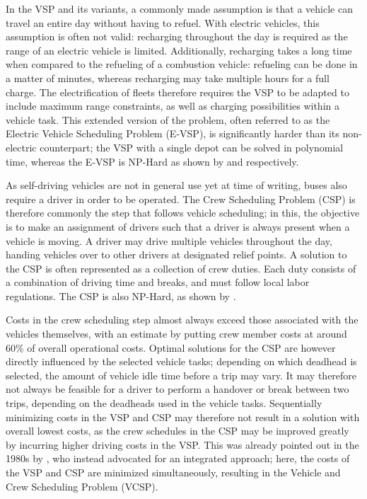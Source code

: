 \documentclass[]{article}
\begin{document}
In the VSP and its variants, a commonly made assumption is that a vehicle can travel an entire day without having to refuel. With electric vehicles, this assumption is often not valid: recharging throughout the day is required as the range of an electric vehicle is limited. Additionally, recharging takes a long time when compared to the refueling of a combustion vehicle: refueling can be done in a matter of minutes, whereas recharging may take multiple hours for a full charge. The electrification of fleets therefore requires the VSP to be adapted to include maximum range constraints, as well as charging possibilities within a vehicle task. This extended version of the problem, often referred to as the Electric Vehicle Scheduling Problem (E-VSP), is significantly harder than its non-electric counterpart; the VSP with a single depot can be solved in polynomial time, whereas the E-VSP is NP-Hard as shown by \citet{Bunte2009} and \citet{Sassi2014} respectively.

As self-driving vehicles are not in general use yet at time of writing, buses also require a driver in order to be operated. The Crew Scheduling Problem (CSP) is therefore commonly the step that follows vehicle scheduling; in this, the objective is to make an assignment of drivers such that a driver is always present when a vehicle is moving. A driver may drive multiple vehicles throughout the day, handing vehicles over to other drivers at designated relief points. A solution to the CSP is often represented as a collection of crew duties. Each duty consists of a combination of driving time and breaks, and must follow local labor regulations. The CSP is also NP-Hard, as shown by \citet{Fischetti1989}.

Costs in the crew scheduling step almost always exceed those associated with the vehicles themselves, with an estimate by \citet{Perumal2019Crew} putting crew member costs at around 60\% of overall operational costs. Optimal solutions for the CSP are however directly influenced by the selected vehicle tasks; depending on which deadhead is selected, the amount of vehicle idle time before a trip may vary. It may therefore not always be feasible for a driver to perform a handover or break between two trips, depending on the deadheads used in the vehicle tasks. Sequentially minimizing costs in the VSP and CSP may therefore not result in a solution with overall lowest costs, as the crew schedules in the CSP may be improved greatly by incurring higher driving costs in the VSP. This was already pointed out in the 1980s by \citet{Bodin1983}, who instead advocated for an integrated approach; here, the costs of the VSP and CSP are minimized simultaneously, resulting in the Vehicle and Crew Scheduling Problem (VCSP). \\
\end{document}
